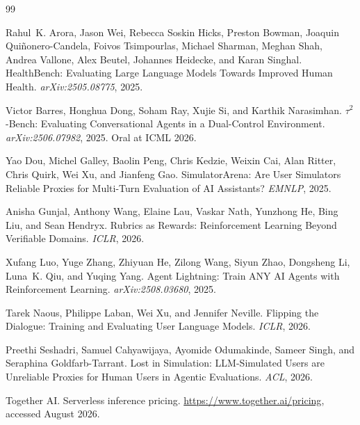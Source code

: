 \documentclass{article}
\begin{document}
{\small
\begin{thebibliography}{99}

Rahul~K. Arora, Jason Wei, Rebecca Soskin Hicks, Preston Bowman, Joaquin Qui\~nonero-Candela, Foivos Tsimpourlas, Michael Sharman, Meghan Shah, Andrea Vallone, Alex Beutel, Johannes Heidecke, and Karan Singhal.
\newblock HealthBench: Evaluating Large Language Models Towards Improved Human Health.
\newblock \emph{arXiv:2505.08775}, 2025.

Victor Barres, Honghua Dong, Soham Ray, Xujie Si, and Karthik Narasimhan.
\newblock $\tau^2$-Bench: Evaluating Conversational Agents in a Dual-Control Environment.
\newblock \emph{arXiv:2506.07982}, 2025. Oral at ICML 2026.

Yao Dou, Michel Galley, Baolin Peng, Chris Kedzie, Weixin Cai, Alan Ritter, Chris Quirk, Wei Xu, and Jianfeng Gao.
\newblock SimulatorArena: Are User Simulators Reliable Proxies for Multi-Turn Evaluation of AI Assistants?
\newblock \emph{EMNLP}, 2025.

Anisha Gunjal, Anthony Wang, Elaine Lau, Vaskar Nath, Yunzhong He, Bing Liu, and Sean Hendryx.
\newblock Rubrics as Rewards: Reinforcement Learning Beyond Verifiable Domains.
\newblock \emph{ICLR}, 2026.

Xufang Luo, Yuge Zhang, Zhiyuan He, Zilong Wang, Siyun Zhao, Dongsheng Li, Luna~K. Qiu, and Yuqing Yang.
\newblock Agent Lightning: Train ANY AI Agents with Reinforcement Learning.
\newblock \emph{arXiv:2508.03680}, 2025.

Tarek Naous, Philippe Laban, Wei Xu, and Jennifer Neville.
\newblock Flipping the Dialogue: Training and Evaluating User Language Models.
\newblock \emph{ICLR}, 2026.

Preethi Seshadri, Samuel Cahyawijaya, Ayomide Odumakinde, Sameer Singh, and Seraphina Goldfarb-Tarrant.
\newblock Lost in Simulation: LLM-Simulated Users are Unreliable Proxies for Human Users in Agentic Evaluations.
\newblock \emph{ACL}, 2026.

Together AI.
\newblock Serverless inference pricing.
\newblock \url{https://www.together.ai/pricing}, accessed August 2026.


\end{thebibliography}}
\end{document}
